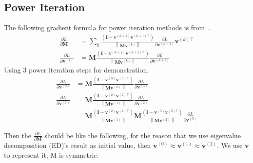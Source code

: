 \documentclass{article}
\newcommand{\bM}{\mathbf{M}}
\newcommand{\bv}{\mathbf{v}}
\newcommand{\bI}{\mathbf{I}}
\begin{document}
	\subsection{Power Iteration}
	\label{sec: pi}
	The following gradient formula for power iteration methods is from~\cite{ye2017dynamic}.
	\begin{equation}
	\begin{aligned} 
	\frac{\partial L}{\partial \bM} &=\sum_{k} \frac{\left(\bI-\bv^{(k+1)} \bv^{(k+1)\top}\right)}{\left\|\bM \bv^{(k)}\right\|} \frac{\partial L}{\partial \bv^{(k+1)}} \bv^{(k)\top} \\
	\frac{\partial L}{\partial \bv^{(k)}} &=\bM \frac{\left(\bI-\bv^{(k+1)} \bv^{(k+1)\top}\right)}{\left\|\bM \bv^{(k)}\right\|} \frac{\partial L}{\partial \bv^{(k+1)}} 
	\end{aligned}
	\end{equation}
	Using 3 power iteration steps for demonstration.
	\begin{equation}
	\begin{aligned} 
	\frac{\partial L}{\partial \bv^{(2)}} &=\bM \frac{\left(\bI-\bv^{(3)} \bv^{(3)\top}\right)}{\left\|\bM \bv^{(2)}\right\|} \frac{\partial L}{\partial \bv^{(3)}}\\
	\frac{\partial L}{\partial \bv^{(1)}} &=\bM \frac{\left(\bI-\bv^{(2)} \bv^{(2)\top}\right)}{\left\|\bM \bv^{(1)}\right\|} \frac{\partial L}{\partial \bv^{(2)}}\\
	&=\bM \frac{\left(\bI-\bv^{(2)} \bv^{(2)\top}\right)}{\left\|\bM \bv^{(1)}\right\|} 
	\bM \frac{\left(\bI-\bv^{(3)} \bv^{(3)\top}\right)}{\left\|\bM \bv^{(2)}\right\|} \frac{\partial L}{\partial \bv^{(3)}}
	\end{aligned}
	\end{equation}
	
	Then the $\frac{\partial L}{\partial \bM}$ should be like the following, for the reason that we use eigenvalue decomposition (ED)'s result as initial value, then $\bv^{(0)}\approx\bv^{(1)}\approx\bv^{(2)}$. We use $\bv$ to represent it, M is symmetric.
	
\end{document}
